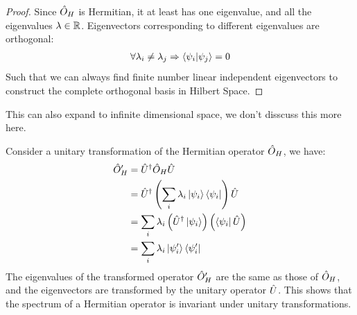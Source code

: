 \begin{proof}
    Since $\hat{O}_H$ is Hermitian, it at least has one eigenvalue, and all the eigenvalues $\lambda \in \mathbb{R}$. Eigenvectors corresponding to different eigenvalues are orthogonal: 
    \begin{eqnarray*}
        \forall \lambda_i \neq \lambda_j \Rightarrow \braket{\psi_i| \psi_j} = 0
    \end{eqnarray*}
    Such that we can always find finite number linear independent eigenvectors to construct the complete orthogonal basis in Hilbert Space. 
\end{proof}

This can also expand to infinite dimensional space, we don't disscuss this more here.

Consider a unitary transformation of the Hermitian operator $\hat{O}_H$, we have:
\begin{align}
    \hat{O}_H' &= \hat{U}^ \dag \hat{O}_H \hat{U} \notag \\
    &= \hat{U}^ \dag \left( \sum_i \lambda_i \ket{\psi_i} \bra{\psi_i} \right) \hat{U} \notag \\
    &= \sum_i \lambda_i \left( \hat{U}^ \dag \ket{\psi_i} \right) \left( \bra{\psi_i} \hat{U} \right) \notag \\
    &= \sum_i \lambda_i \ket{\psi_i'} \bra{\psi_i'}
\end{align}
The eigenvalues of the transformed operator $\hat{O}_H'$ are the same as those of $\hat{O}_H$, and the eigenvectors are transformed by the unitary operator $\hat{U}$. This shows that the spectrum of a Hermitian operator is invariant under unitary transformations.
